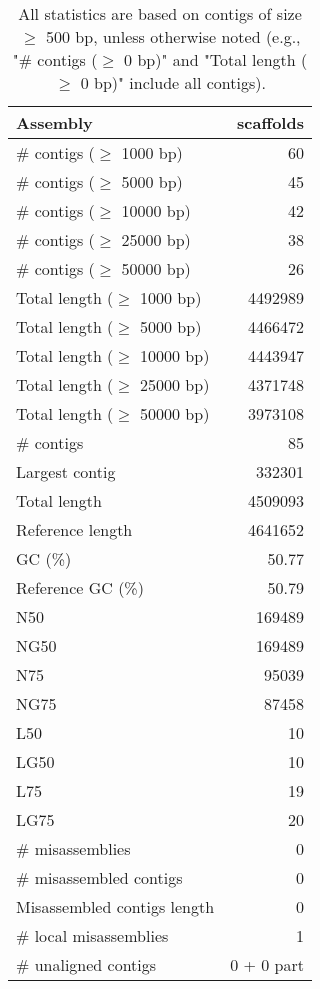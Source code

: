 \documentclass[12pt,a4paper]{article}
\begin{document}
\begin{table}[ht]
\begin{center}
\caption{All statistics are based on contigs of size $\geq$ 500 bp, unless otherwise noted (e.g., "\# contigs ($\geq$ 0 bp)" and "Total length ($\geq$ 0 bp)" include all contigs).}
\begin{tabular}{|l*{1}{|r}|}
\hline
Assembly & scaffolds \\ \hline
\# contigs ($\geq$ 1000 bp) & 60 \\ \hline
\# contigs ($\geq$ 5000 bp) & 45 \\ \hline
\# contigs ($\geq$ 10000 bp) & 42 \\ \hline
\# contigs ($\geq$ 25000 bp) & 38 \\ \hline
\# contigs ($\geq$ 50000 bp) & 26 \\ \hline
Total length ($\geq$ 1000 bp) & 4492989 \\ \hline
Total length ($\geq$ 5000 bp) & 4466472 \\ \hline
Total length ($\geq$ 10000 bp) & 4443947 \\ \hline
Total length ($\geq$ 25000 bp) & 4371748 \\ \hline
Total length ($\geq$ 50000 bp) & 3973108 \\ \hline
\# contigs & 85 \\ \hline
Largest contig & 332301 \\ \hline
Total length & 4509093 \\ \hline
Reference length & 4641652 \\ \hline
GC (\%) & 50.77 \\ \hline
Reference GC (\%) & 50.79 \\ \hline
N50 & 169489 \\ \hline
NG50 & 169489 \\ \hline
N75 & 95039 \\ \hline
NG75 & 87458 \\ \hline
L50 & 10 \\ \hline
LG50 & 10 \\ \hline
L75 & 19 \\ \hline
LG75 & 20 \\ \hline
\# misassemblies & 0 \\ \hline
\# misassembled contigs & 0 \\ \hline
Misassembled contigs length & 0 \\ \hline
\# local misassemblies & 1 \\ \hline
\# unaligned contigs & 0 + 0 part \\ \hline

\end{tabular}
\end{center}
\end{table}
\end{document}
